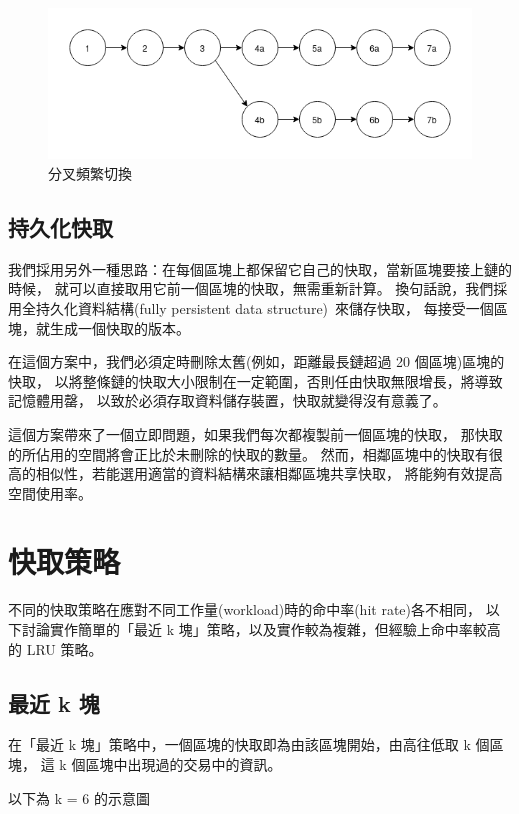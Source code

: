 \begin{figure}[h!]
\includegraphics[width=\textwidth]{快取長分叉}
\caption{分叉頻繁切換}
\end{figure}

\subsection{持久化快取}

我們採用另外一種思路：在每個區塊上都保留它自己的快取，當新區塊要接上鏈的時候，
就可以直接取用它前一個區塊的快取，無需重新計算。
換句話說，我們採用全持久化資料結構(fully persistent data structure)~\cite{driscoll1986making}來儲存快取，
每接受一個區塊，就生成一個快取的版本。

在這個方案中，我們必須定時刪除太舊(例如，距離最長鏈超過 20 個區塊)區塊的快取，
以將整條鏈的快取大小限制在一定範圍，否則任由快取無限增長，將導致記憶體用罄，
以致於必須存取資料儲存裝置，快取就變得沒有意義了。

這個方案帶來了一個立即問題，如果我們每次都複製前一個區塊的快取，
那快取的所佔用的空間將會正比於未刪除的快取的數量。
然而，相鄰區塊中的快取有很高的相似性，若能選用適當的資料結構來讓相鄰區塊共享快取，
將能夠有效提高空間使用率。

\section{快取策略}

不同的快取策略在應對不同工作量(workload)時的命中率(hit rate)各不相同，
以下討論實作簡單的「最近 k 塊」策略，以及實作較為複雜，但經驗上命中率較高的 LRU 策略。

\subsection{最近 k 塊}

在「最近 k 塊」策略中，一個區塊的快取即為由該區塊開始，由高往低取 k 個區塊，
這 k 個區塊中出現過的交易中的資訊。

以下為 k = 6 的示意圖


